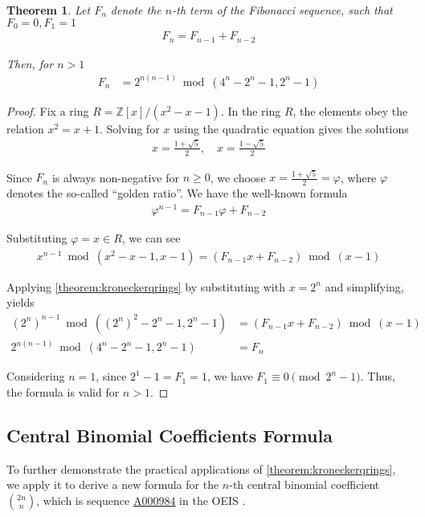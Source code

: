 \documentclass[12pt,reqno]{article}
\theoremstyle{plain}
\newtheorem{theorem}{Theorem}
\theoremstyle{definition}
\newcommand{\seqnum}[1]{\href{https://oeis.org/#1}{\rm \underline{#1}}}
\begin{document}
\begin{theorem}
Let $F_n$ denote the $n$-th term of the Fibonacci sequence, such that $F_0 = 0, F_1 = 1$
\begin{align*}
    F_n = F_{n-1} + F_{n-2}
\end{align*}

Then, for $n > 1$
\begin{align*}
F_n &= 2^{n (n - 1)} \bmod{(4^n-2^n-1, 2^n-1)}
\end{align*}
\end{theorem}
\begin{proof}
Fix a ring $R = \mathbb{Z}[x]/(x^2 - x - 1)$. In the ring $R$, the elements obey the relation $x^2 = x + 1$. Solving for $x$ using the quadratic equation gives the solutions
\begin{align*}
    x = \frac{1 + \sqrt{5}}{2}, \quad x = \frac{1 - \sqrt{5}}{2}
\end{align*}

Since $F_n$ is always non-negative for $n \geq 0$, we choose $x = \frac{1 + \sqrt{5}}{2} = \varphi$, where $\varphi$ denotes the so-called ``golden ratio''. We have the well-known formula \cite{A000045}
\begin{align*}
    \varphi^{n-1} = F_{n-1} \varphi + F_{n-2}
\end{align*}

Substituting $\varphi = x \in R$, we can see
\begin{align*}
    x^{n-1} \bmod{(x^2 - x - 1, x-1)} = (F_{n-1} x + F_{n-2}) \bmod{(x-1)}
\end{align*}

Applying \cref{theorem:kroneckerqrings} by substituting with $x = 2^n$ and simplifying, yields
\begin{align*}
    (2^n)^{n-1} \bmod{((2^n)^2 - 2^n - 1, 2^n-1)} &= (F_{n-1} x + F_{n-2}) \bmod{(x-1)} \\
    2^{n (n - 1)} \bmod{(4^n - 2^n - 1, 2^n-1)} &= F_n
\end{align*}

Considering $n = 1$, since $2^1-1 = F_1 = 1$, we have $F_1 \equiv 0 \pmod{2^n - 1}$. Thus, the formula is valid for $n > 1$.
\end{proof}

\subsection{Central Binomial Coefficients Formula}
To further demonstrate the practical applications of \cref{theorem:kroneckerqrings}, we apply it to derive a new formula for the $n$-th central binomial coefficient $\binom{2n}{n}$, which is sequence \seqnum{A000984} in the OEIS \cite{A000984}.
\end{document}
